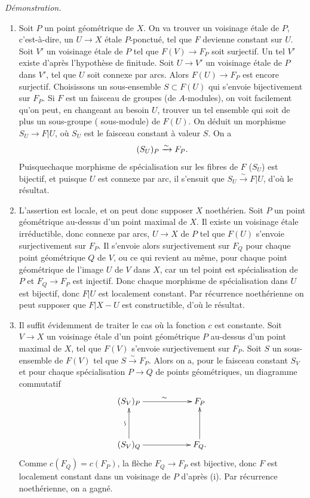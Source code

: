 \documentclass[10pt]{../fichiers-configuration-latex/smfart}
\begin{document}
\emph{Démonstration.}
\begin{enumerate}
\renewcommand{\theenumi}{\roman{enumi}}
\renewcommand{\labelenumi}{(\theenumi)}
\item Soit $P$ un point géométrique de $X$. On va trouver
un voisinage étale de $P$, c'est-à-dire, un $U\rightarrow X$ étale
$P$-ponctué, tel que $F$ devienne constant sur $U$. Soit $V'$ un
voisinage étale de $P$ tel que $F(V)\rightarrow F_P$ soit
surjectif. Un tel $V'$ existe d'après l'hypothèse de finitude. Soit
$U\rightarrow V'$ un voisinage étale de $P$ dans $V'$, tel que $U$
soit connexe par arcs. Alors $F(U)\rightarrow F_P$ est encore
surjectif. Choisissons un sous-ensemble $S\subset F(U)$ qui s'envoie
bijectivement sur $F_P$. Si $F$ est un faisceau de groupes (\resp de
$A$-modules), on voit facilement qu'on peut, en changeant au besoin
$U$, trouver un tel ensemble qui soit de plus un sous-groupe (\resp
sous-module) de $F(U)$. On déduit un morphisme $S_U\rightarrow F|
U$, où $S_U$ est le faisceau constant à valeur $S$. On a
$$
(S_U)_P\xrightarrow{\sim}F_P{}.
$$
Puisque\pageoriginale chaque morphisme de spécialisation sur les
fibres de $F$ (\resp $S_U$) est bijectif, et puisque $U$ est connexe
par arc, il s'ensuit que $S_U\xrightarrow{\sim}F| U$, d'où le
résultat.

\item L'assertion est locale, et on peut donc supposer $X$
noethérien. Soit $P$ un point géométrique au-dessus d'un point maximal
de $X$. Il existe un voisinage étale irréductible, donc connexe par
arcs, $U\rightarrow X$ de $P$ tel que $F(U)$ s'envoie surjectivement
sur $F_P$. Il s'envoie alors surjectivement sur $F_Q$ pour chaque
point géométrique $Q$ de $V$, ou ce qui revient au même, pour chaque
point géométrique de l'image $U$ de $V$ dans $X$, car un tel point est
spécialisation de $P$ et $F_Q\rightarrow F_P$ est injectif. Donc
chaque morphisme de spécialisation dans $U$ est bijectif, donc $F|
U$ est localement constant. Par récurrence noethérienne on peut
supposer que $F| X-U$ est constructible, d'où le résultat.

\item Il suffit évidemment de traiter le cas où la fonction $c$ est
constante. Soit $V\rightarrow X$ un voisinage étale d'un point
géométrique $P$ au-dessus d'un point maximal de $X$, tel que $F(V)$
s'envoie surjectivement sur $F_P$. Soit $S$ un sous-ensemble de $F(V)$
tel que $S\xrightarrow{\sim}F_P$. Alors on a, pour le faisceau
constant $S_V$ et pour chaque spécialisation $P\rightarrow Q$ de
points géométriques, un diagramme commutatif
$$
\xymatrix@C=2cm@R=1.25cm{
(S_V)_P   \ar[r]^{\sim}& F_P\\
(S_V)_Q   \ar[r] \ar[u]^{\text{\rotatebox{90}{$\backsim$}}}  & F_Q. \ar[u]
}
$$
Comme $c(F_Q)=c(F_P)$, la flèche $F_Q\rightarrow F_P$ est bijective,
donc $F$ est localement constant dans un voisinage de $P$ d'après
(i). Par récurrence noethérienne, on a gagné.
\end{enumerate}
\end{document}
